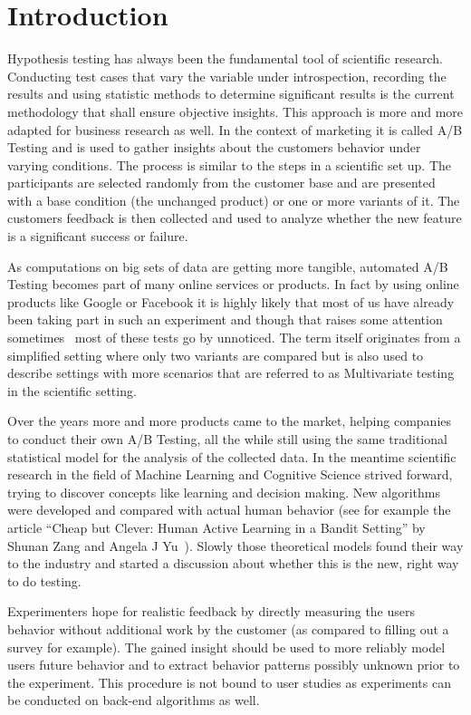 \documentclass[main.tex]{subfiles}
\begin{document}
\chapter{Introduction}
Hypothesis testing has always been the fundamental tool of scientific research. Conducting test cases that vary the variable under introspection, recording the results and using statistic methods to determine significant results is the current methodology that shall ensure objective insights. This approach is more and more adapted for business research as well. In the context of marketing it is called A/B Testing and is used to gather insights about the customers behavior under varying conditions. The process is similar to the steps in a scientific set up. The participants are selected randomly from the customer base and are presented with a base condition (the unchanged product) or one or more variants of it. The customers feedback is then collected and used to analyze whether the new feature is a significant success or failure.

As computations on big sets of data are getting more tangible, automated A/B Testing becomes part of many online services or products. In fact by using online products like Google or Facebook it is highly likely that most of us have already been taking part in such an experiment and though that raises some attention sometimes~\cite{arthur2014facebook} most of these tests go by unnoticed. The term itself originates from a simplified setting where only two variants are compared but is also used to describe settings with more scenarios that are referred to as Multivariate testing in the scientific setting. 

Over the years more and more products came to the market, helping companies to conduct their own A/B Testing, all the while still using the same traditional statistical model for the analysis of the collected data. In the meantime scientific research in the field of Machine Learning and Cognitive Science strived forward, trying to discover concepts like learning and decision making. New algorithms were developed and compared with actual human behavior (see for example the article ``Cheap but Clever: Human Active Learning in a Bandit Setting'' by Shunan Zang and Angela J Yu~\cite{zhang2013cheap}). Slowly those theoretical models found their way to the industry and started a discussion about whether this is the new, right way to do testing.

Experimenters hope for realistic feedback by directly measuring the users behavior without additional work by the customer (as compared to filling out a survey for example). The gained insight should be used to more reliably model users future behavior and to extract behavior patterns possibly unknown prior to the experiment. This procedure is not bound to user studies as experiments can be conducted on back-end algorithms as well.
\end{document}

